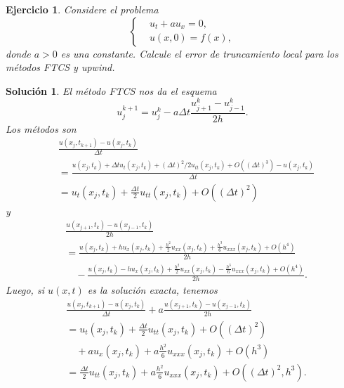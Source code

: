 \documentclass[11pt]{article}
\newtheorem{exercise}{Ejercicio}
\newtheorem*{sol}{Solución}
\newcommand\<{\langle}
\renewcommand\>{\rangle}
\begin{document}
\begin{exercise}
  Considere el problema
  \begin{equation}
    \left\{
      \begin{aligned}
        & u_t + a u_x = 0,
        \\
        & u(x,0) = f(x),
      \end{aligned}
    \right.
  \end{equation}
  donde $a>0$ es una constante. Calcule el error de truncamiento local
  para los métodos FTCS y upwind.
\end{exercise}
\begin{sol}
  El método FTCS nos da el esquema
  \begin{equation}
    u_j^{k+1} = u_j^k - a\Delta t \frac{u_{j+1}^k-u_{j-1}^k}{2h}
  .\end{equation}
  Los métodos son
  \begin{align}
    &\frac{u(x_j,t_{k+1}) - u(x_{j},t_k)}{\Delta t}
    \\
      &=
      \frac
      {
        u(x_j,t_k)
        +\Delta tu_t(x_j,t_k)
        +(\Delta t)^{2}/2 u_{tt}(x_j,t_k)
        + O((\Delta t)^{3})
        - u(x_{j},t_k)
      }
      {\Delta t}
      \\
      &=
        u_t(x_j,t_k)
        +\frac{\Delta t}{2} u_{tt}(x_j,t_k)
        + O((\Delta t)^{2})
  \end{align}
  y
  \begin{align}
    &\frac{u(x_{j+1},t_k)-u(x_{j-1},t_k)}{2h} \\
    &=
    \frac{
      u(x_j,t_k)
      + hu_x(x_j,t_k)
      +\frac{h^{2}}{2}u_{xx}(x_j,t_k)
      +\frac{h^{3}}{6}u_{xxx}(x_j,t_k)
      +O(h^{4})
      }{2h} \\
      &\quad - \frac{
      u(x_{j},t_k)
      - h u_{x}(x_{j},t_k)
      +\frac{h^{2}}{2} u_{xx}(x_j,t_k)
      - \frac{h^{3}}{6}u_{xxx}(x_j,t_k)
      +O(h^{4})
      }{2h}
  .\end{align}
  Luego, si $u(x,t)$ es la solución exacta, tenemos
  \begin{align}
    &\frac{u(x_j,t_{k+1}) - u(x_{j},t_k)}{\Delta t}
    + a \frac{u(x_{j+1},t_k)-u(x_{j-1},t_k)}{2h}
    \\
      &=
        u_t(x_j,t_k)
        +\frac{\Delta t}{2} u_{tt}(x_j,t_k)
        + O((\Delta t)^{2})
        \\
      &\quad
      + au_x(x_j,t_k) +a\frac{h^{2}}{6}u_{xxx}(x_j,t_k)
      +O(h^{3})
    \\
      &=
        \frac{\Delta t}{2} u_{tt}(x_j,t_k)
        + a \frac{h^{2}}{6}u_{xxx}(x_j,t_k)
        + O((\Delta t)^{2},h^{3})
  .\end{align}
  

  
\end{sol}
\end{document}
